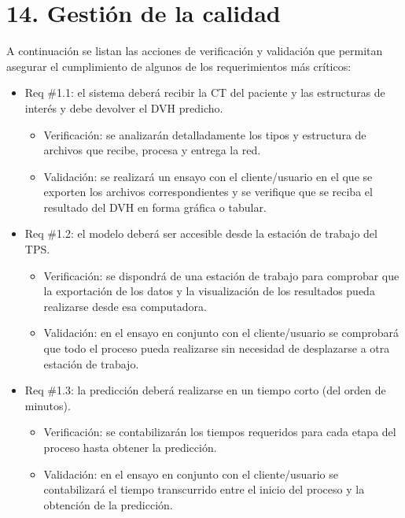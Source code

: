 \documentclass[
11pt, %
codirector, %
]{charter}
\begin{document}
\section{14. Gestión de la calidad}
\label{sec:calidad}

A continuación se listan las acciones de verificación y validación que permitan asegurar el cumplimiento de algunos de los requerimientos más críticos:

\begin{itemize} 
\item Req \#1.1: el sistema deberá recibir la CT del paciente y las estructuras de interés y debe devolver el DVH predicho.

\begin{itemize}
	\item Verificación: se analizarán detalladamente los tipos y estructura de archivos que recibe, procesa y entrega la red.
	\item Validación: se realizará un ensayo con el cliente/usuario en el que se exporten los archivos correspondientes y se verifique que se reciba el resultado del DVH en forma gráfica o tabular.  
\end{itemize}

\newpage
\item Req \#1.2: el modelo deberá ser accesible desde la estación de trabajo del TPS.

\begin{itemize}
	\item Verificación: se dispondrá de una estación de trabajo para comprobar que la exportación de los datos y la visualización de los resultados pueda realizarse desde esa computadora.
	\item Validación: en el ensayo en conjunto con el cliente/usuario se comprobará que todo el proceso pueda realizarse sin necesidad de desplazarse a otra estación de trabajo.  
\end{itemize}

\item Req \#1.3: la predicción deberá realizarse en un tiempo corto (del orden de minutos).

\begin{itemize}
	\item Verificación: se contabilizarán los tiempos requeridos para cada etapa del proceso hasta obtener la predicción.
	\item Validación: en el ensayo en conjunto con el cliente/usuario se contabilizará el tiempo transcurrido entre el inicio del proceso y la obtención de la predicción.  
\end{itemize}


\end{itemize}
\end{document}
